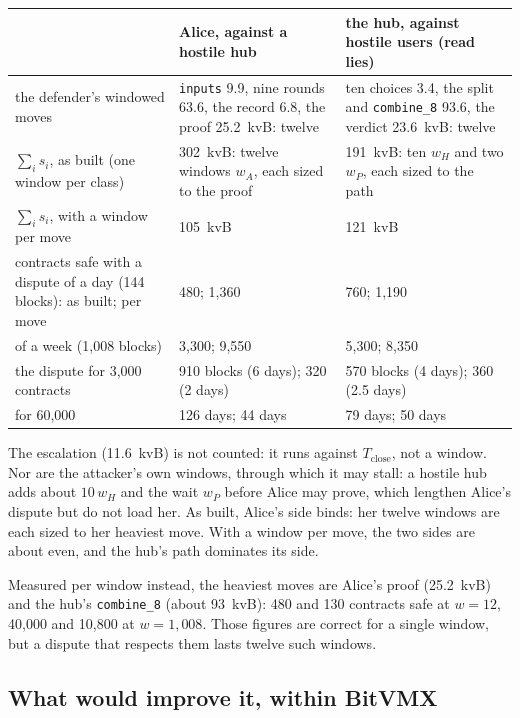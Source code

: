 \documentclass[11pt]{article}
\newcommand{\Tc}{T_{\mathrm{close}}}
\newcommand{\tx}[1]{\texttt{#1}}
\begin{document}
\begin{center}
\small
\begin{tabularx}{\linewidth}{>{\raggedright\arraybackslash}p{40mm}LL}
\toprule
& Alice, against a hostile hub & the hub, against hostile users (read lies) \\
\midrule
the defender's windowed moves & \tx{inputs} 9.9, nine rounds 63.6, the record 6.8, the proof 25.2~kvB: twelve & ten choices 3.4, the split and \tx{combine\_8} 93.6, the verdict 23.6~kvB: twelve \\
$\sum_i s_i$, as built (one window per class) & 302~kvB: twelve windows $w_A$, each sized to the proof & 191~kvB: ten $w_H$ and two $w_P$, each sized to the path \\
$\sum_i s_i$, with a window per move & 105~kvB & 121~kvB \\
contracts safe with a dispute of a day (144 blocks): as built; per move & 480; 1,360 & 760; 1,190 \\
of a week (1,008 blocks) & 3,300; 9,550 & 5,300; 8,350 \\
the dispute for 3,000 contracts & 910 blocks (6 days); 320 (2 days) & 570 blocks (4 days); 360 (2.5 days) \\
for 60,000 & 126 days; 44 days & 79 days; 50 days \\
\bottomrule
\end{tabularx}
\end{center}
The escalation (11.6~kvB) is not counted: it runs against $\Tc$, not a
window. Nor are the attacker's own windows, through which it may stall:
a hostile hub adds about $10\,w_H$ and the wait $w_P$ before Alice may
prove, which lengthen Alice's dispute but do not load her. As built,
Alice's side binds: her twelve windows are each sized to her heaviest
move. With a window per move, the two sides are about even, and the hub's
path dominates its side.

Measured per window instead, the heaviest moves are Alice's proof
(25.2~kvB) and the hub's \tx{combine\_8} (about 93~kvB): 480 and 130
contracts safe at $w = 12$, 40,000 and 10,800 at $w = 1{,}008$. Those
figures are correct for a single window, but a dispute that respects them
lasts twelve such windows.

\subsection{What would improve it, within BitVMX}
\end{document}
